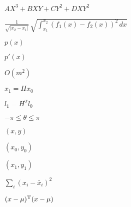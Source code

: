 \documentclass{article}
\begin{document}
$A X^3 + B XY + C Y^2 + D XY^2$
\pagebreak

$\frac1{\sqrt{|x_2-x_1|}}\,\sqrt{\int_{x_1}^{x_2}\left(f_1(x)-f_2(x)\right)^2\,dx}$
\pagebreak

$p(x)$
\pagebreak

$p'(x)$
\pagebreak

$O(m^2)$
\pagebreak

$x_1 = H x_0 $
\pagebreak

$l_1 = H^T l_0 $
\pagebreak

$-\pi\le\theta\le\pi$
\pagebreak

$(x,y)$
\pagebreak

$(x_0,y_0)$
\pagebreak

$(x_1,y_1)$
\pagebreak

$\sum_i(x_i - \bar{x}_i)^2$
\pagebreak

$(x - \mu)^{\rm T}(x - \mu)$
\pagebreak
\end{document}
